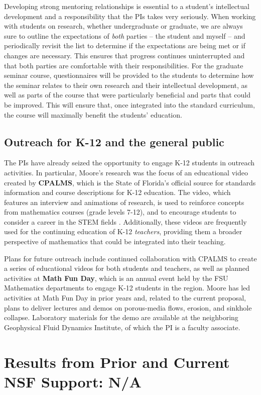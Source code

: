 \documentclass[12pt]{article}
\begin{document}
Developing strong mentoring relationships is essential to a student's intellectual development and a responsibility that the PIs takes very seriously. When working with students on research, whether undergraduate or graduate, we are always sure to outline the expectations of {\em both} parties -- the student and myself -- and periodically revisit the list to determine if the expectations are being met or if changes are necessary. This ensures that progress continues uninterrupted and that both parties are comfortable with their responsibilities. For the graduate seminar course, questionnaires will be provided to the students to determine how the seminar relates to their own research and their intellectual development, as well as parts of the course that were particularly beneficial and parts that could be improved. This will ensure that, once integrated into the standard curriculum, the course will maximally benefit the students' education.


\subsection{Outreach for K-12 and the general public}

The PIs have already seized the opportunity to engage K-12 students in outreach activities. In particular, Moore's research was the focus of an educational video created by {\bf CPALMS}, which is the State of Florida's official source for standards information and course descriptions for K-12 education. The video, which features an interview and animations of research, is used to reinforce concepts from mathematics courses (grade levels 7-12), and to encourage students to consider a career in the STEM fields \cite{CPALMS}. Additionally, these videos are frequently used for the continuing education of K-12 {\em teachers}, providing them a broader perspective of mathematics that could be integrated into their teaching.
 
Plans for future outreach include continued collaboration with CPALMS to create a series of educational videos for both students and teachers, as well as planned activities at {\bf Math Fun Day}, which is an annual event held by the FSU Mathematics departments to engage K-12 students in the region. Moore has led activities at Math Fun Day in prior years and, related to the current proposal, plans to deliver lectures and demos on porous-media flows, erosion, and sinkhole collapse.
Laboratory materials for the demo are available at the neighboring Geophysical Fluid Dynamics Institute, of which the PI is a faculty associate.

\section{Results from Prior and Current NSF Support: N/A}


\newpage
\setcounter{page}{1}

%

\end{document}
